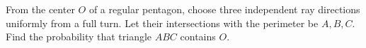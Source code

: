 From the center $O$ of a regular pentagon, choose three independent ray directions uniformly from a full turn. Let their intersections with the perimeter be $A,B,C$. Find the probability that triangle $ABC$ contains $O$.
